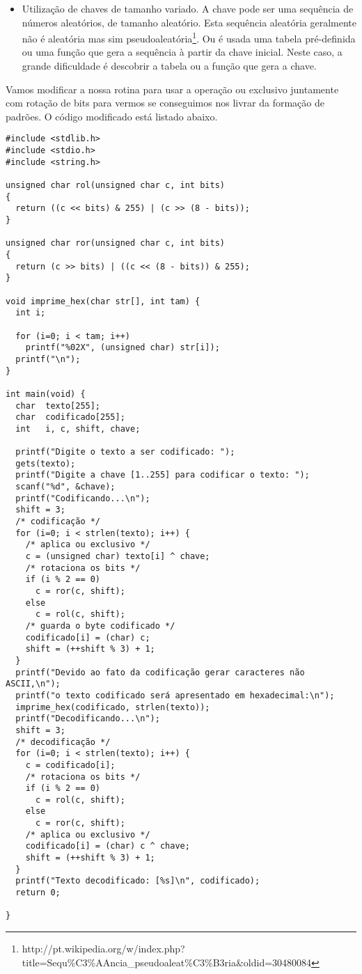 \begin{itemize}
\item Utilização de chaves de tamanho variado. A chave pode ser uma sequência de números aleatórios, de tamanho aleatório. Esta sequência aleatória geralmente não é aleatória mas sim pseudoaleatória\footnote{http://pt.wikipedia.org/w/index.php?title=Sequ\%C3\%AAncia\_pseudoaleat\%C3\%B3ria\&oldid=30480084}. Ou é usada uma tabela pré-definida ou uma função que gera a sequência à partir da chave inicial. Neste caso, a grande dificuldade é descobrir a tabela ou a função que gera a chave.
\end{itemize}

Vamos modificar a nossa rotina para usar a operação ou exclusivo juntamente com rotação de bits para vermos se conseguimos nos livrar da formação de padrões. O código modificado está listado abaixo.

{{{
\renewcommand{\baselinestretch}{1.0}
\begin{verbatim}
#include <stdlib.h>
#include <stdio.h>
#include <string.h>

unsigned char rol(unsigned char c, int bits)
{
  return ((c << bits) & 255) | (c >> (8 - bits)); 
}

unsigned char ror(unsigned char c, int bits)
{
  return (c >> bits) | ((c << (8 - bits)) & 255);
}

void imprime_hex(char str[], int tam) {
  int i;
  
  for (i=0; i < tam; i++)
    printf("%02X", (unsigned char) str[i]);
  printf("\n");
}

int main(void) {
  char  texto[255];
  char  codificado[255];
  int   i, c, shift, chave;

  printf("Digite o texto a ser codificado: ");
  gets(texto);
  printf("Digite a chave [1..255] para codificar o texto: ");
  scanf("%d", &chave);
  printf("Codificando...\n");
  shift = 3;
  /* codificação */
  for (i=0; i < strlen(texto); i++) {
    /* aplica ou exclusivo */
    c = (unsigned char) texto[i] ^ chave;
    /* rotaciona os bits */
    if (i % 2 == 0)
      c = ror(c, shift);
    else
      c = rol(c, shift); 
    /* guarda o byte codificado */
    codificado[i] = (char) c;
    shift = (++shift % 3) + 1;
  }
  printf("Devido ao fato da codificação gerar caracteres não ASCII,\n");
  printf("o texto codificado será apresentado em hexadecimal:\n");
  imprime_hex(codificado, strlen(texto));
  printf("Decodificando...\n");
  shift = 3;
  /* decodificação */
  for (i=0; i < strlen(texto); i++) {
    c = codificado[i];
    /* rotaciona os bits */
    if (i % 2 == 0)
      c = rol(c, shift);
    else
      c = ror(c, shift); 
    /* aplica ou exclusivo */
    codificado[i] = (char) c ^ chave;
    shift = (++shift % 3) + 1;
  }
  printf("Texto decodificado: [%s]\n", codificado);
  return 0;

}
\end{verbatim}
}}}

